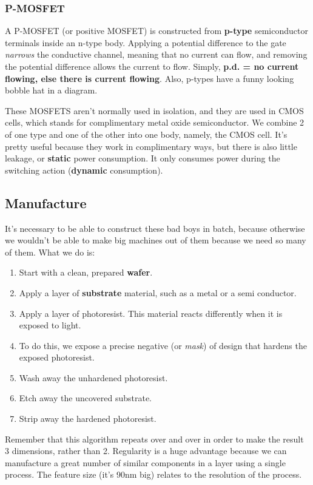 \documentclass[11pt,a4paper,titlepage,dvipsnames,cmyk]{scrartcl}
\begin{document}
\subsubsection{P-MOSFET}%
\label{ssub:P-MOSFET}
A P-MOSFET (or positive MOSFET) is constructed from \textbf{p-type}
semiconductor terminals inside an n-type body. Applying a potential difference to the gate
\textit{narrows} the conductive channel, meaning that no current can flow, and
removing the potential difference allows the current to flow. Simply, \textbf{p.d. = no
current flowing, else there is current flowing}. Also, p-types have a funny
looking bobble hat in a diagram.

These MOSFETS aren't normally used in isolation, and they are used in CMOS
cells, which stands for complimentary metal oxide semiconductor. We combine 2 of
one type and one of the other into one body, namely, the CMOS cell. It's pretty
useful because they work in complimentary ways, but there is also little
leakage, or \textbf{static} power consumption. It only consumes power during the
switching action (\textbf{dynamic} consumption).

\subsection{Manufacture}%
\label{sub:Manufacture}
It's necessary to be able to construct these bad boys in batch, because
otherwise we wouldn't be able to make big machines out of them because we need
so many of them. What we do is:
\begin{enumerate}
    \item Start with a clean, prepared \textbf{wafer}.
    \item Apply a layer of \textbf{substrate} material, such as a metal or a
        semi conductor.
    \item Apply a layer of photoresist. This material reacts differently when it
        is exposed to light.
    \item To do this, we expose a precise negative (or \textit{mask}) of design
        that hardens the exposed photoresist.
    \item Wash away the unhardened photoresist.
    \item Etch away the uncovered substrate.
    \item Strip away the hardened photoresist.
\end{enumerate}

Remember that this algorithm repeats over and over in order to make the result 3
dimensions, rather than 2. Regularity is a huge advantage because we can
manufacture a great number of similar components in a layer using a single
process. The feature size (it's 90nm big) relates to the resolution of the
process.
\end{document}

